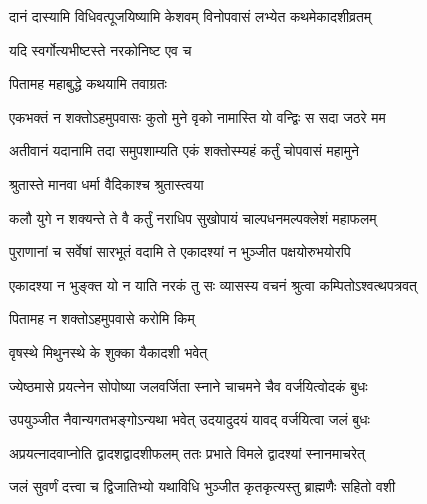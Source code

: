 \twolineshloka
{दानं दास्यामि विधिवत्पूजयिष्यामि केशवम्}
{विनोपवासं लभ्येत कथमेकादशीव्रतम्} %



\onelineshloka
{यदि स्वर्गोत्यभीष्टस्ते नरकोनिष्ट एव च} %



\onelineshloka
{पितामह महाबुद्धे कथयामि तवाग्रतः} %

\twolineshloka
{एकभक्तं न शक्तोऽहमुपवासः कुतो मुने}
{वृको नामास्ति यो वन्द्विः स सदा जठरे मम} %

\twolineshloka
{अतीवानं यदानामि तदा समुपशाम्यति}
{एकं शक्तोस्म्यहं कर्तुं चोपवासं महामुने} %



\onelineshloka
{श्रुतास्ते मानवा धर्मा वैदिकाश्च श्रुतास्त्वया} %

\twolineshloka
{कलौ युगे न शक्यन्ते ते वै कर्तुं नराधिप}
{सुखोपायं चाल्पधनमल्पक्लेशं महाफलम्} %

\twolineshloka
{पुराणानां च सर्वेषां सारभूतं वदामि ते}
{एकादश्यां न भुञ्जीत पक्षयोरुभयोरपि} %

\twolineshloka
{एकादश्या न भुङ्क्त यो न याति नरकं तु सः}
{व्यासस्य वचनं श्रुत्वा कम्पितोऽश्वत्थपत्रवत्} %



\onelineshloka
{पितामह न शक्तोऽहमुपवासे करोमि किम्} %



\onelineshloka
{वृषस्थे मिथुनस्थे के शुक्का यैकादशी भवेत्} %

\twolineshloka
{ज्येष्ठमासे प्रयत्नेन सोपोष्या जलवर्जिता}
{स्नाने चाचमने चैव वर्जयित्वोदकं बुधः} %

\twolineshloka
{उपयुञ्जीत नैवान्यगतभङ्गोऽन्यथा भवेत्}
{उदयादुदयं यावद् वर्जयित्वा जलं बुधः} %

\twolineshloka
{अप्रयत्नादवाप्नोति द्वादशद्वादशीफलम्}
{ततः प्रभाते विमले द्वादश्यां स्नानमाचरेत्} %

\twolineshloka
{जलं सुवर्णं दत्त्वा च द्विजातिभ्यो यथाविधि}
{भुञ्जीत कृतकृत्यस्तु ब्राह्मणैः सहितो वशी} %

